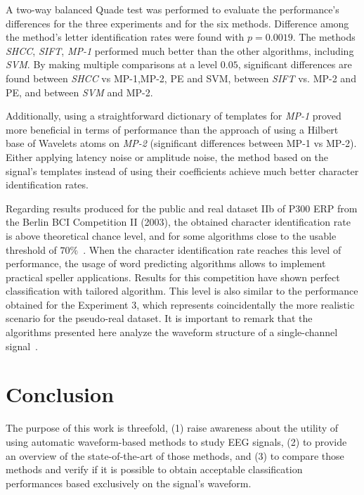 \documentclass[brainsci,article,submit,moreauthors,pdftex,10pt,a4paper]{mdpi}
\begin{document}
A two-way balanced Quade test was performed to evaluate the performance's differences for the three experiments and for the six methods.  Difference among the method's letter identification rates were found with $p=0.0019$.  The methods \textit{SHCC}, \textit{SIFT}, \textit{MP-1} performed much better than the other algorithms, including \textit{SVM}.  By making multiple comparisons at a level  $0.05$, significant differences are found between \textit{SHCC} vs MP-1,MP-2, PE and SVM, between \textit{SIFT} vs. MP-2 and PE, and between \textit{SVM} and MP-2.

Additionally, using a straightforward dictionary of templates for \textit{MP-1} proved more beneficial in terms of performance than the approach of using a Hilbert base of Wavelets atoms on \textit{MP-2} (significant differences between MP-1 vs MP-2).  Either applying latency noise or amplitude noise, the method based on the signal's templates instead of using their coefficients achieve much better character identification rates.  

Regarding results produced for the public and real dataset IIb of P300 ERP from the Berlin BCI Competition II (2003), the obtained character identification rate is above theoretical chance level, and for some algorithms close to the usable threshold of $70\%$~\citep{Kathner2017}.  When the character identification rate reaches this level of performance, the usage of word predicting algorithms allows to implement practical speller applications.  Results for this competition have shown perfect classification with tailored algorithm.  This level is also similar to the performance obtained for the Experiment 3, which represents coincidentally the more realistic scenario for the pseudo-real dataset.  It is important to remark that the algorithms presented here analyze the waveform structure of a single-channel signal~\citep{Rakotomamonjy2008,Gribonval2008}.  

\section{Conclusion}
\label{section:conclusion}

The purpose of this work is threefold, (1) raise awareness about the utility of using automatic waveform-based methods to study EEG signals, (2) to provide an overview of the state-of-the-art of those methods, and (3) to compare those methods and verify if it is possible to obtain acceptable classification performances based exclusively on the signal's waveform.
\end{document}

